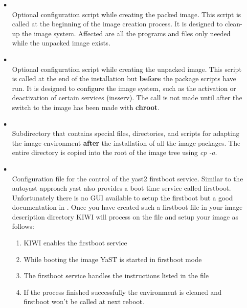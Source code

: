 \begin{itemize}
\item {}\\
      Optional configuration script while creating the packed image.
      This script is called at the beginning of the image creation process.
      It is designed to clean-up the image system. Affected are all the
      programs and files only needed while the unpacked image exists.

\item {}\\
      Optional configuration script while creating the unpacked image. This
      script is called at the end of the installation but \textbf{before}
      the package scripts have run. It is designed to configure the image
      system, such as the activation or deactivation of certain services
      (insserv). The call is not made until after the switch to the image
      has been made with \textbf{chroot}.

\item {}\\
      Subdirectory that contains special files, directories, and scripts for
      adapting the image environment \textbf{after} the installation of all the
      image packages. The entire directory is copied into the root of the
      image tree using \textit{cp -a}.

\item {}\\
      Configuration file for the control of the yast2 firstboot service.
      Similar to the autoyast approach yast also provides a boot time
      service called firstboot. Unfortunately there is no GUI available
      to setup the firstboot but a good documentation in
      . Once you have 
      created such a firstboot file in your image description directory KIWI
      will process on the file and setup your image as follows:

      \begin{enumerate}
      \item KIWI enables the firstboot service
      \item While booting the image YaST is started in firstboot mode
      \item The firstboot service handles the instructions listed in the
             file
      \item If the process finished successfully the environment is
            cleaned and firstboot won't be called at next reboot.
      \end{enumerate} 


\end{itemize}
